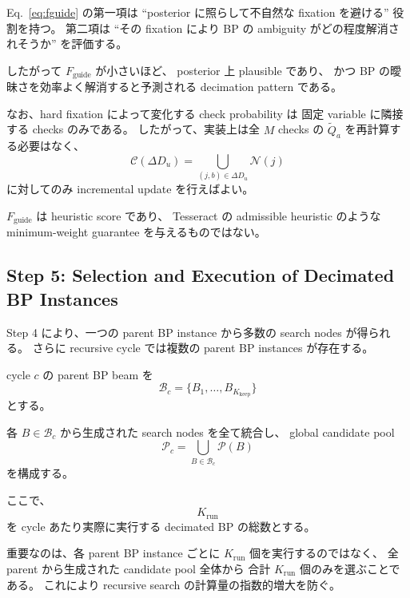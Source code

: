 Eq.~\eqref{eq:fguide} の第一項は
``posterior に照らして不自然な fixation を避ける''
役割を持つ。
第二項は
``その fixation により BP の ambiguity がどの程度解消されそうか''
を評価する。

したがって $F_{\mathrm{guide}}$ が小さいほど、
posterior 上 plausible であり、
かつ BP の曖昧さを効率よく解消すると予測される
decimation pattern である。

なお、hard fixation によって変化する check probability は
固定 variable に隣接する checks のみである。
したがって、実装上は全 $M$ checks の
$\widetilde Q_a$ を再計算する必要はなく、
\begin{equation}
    \mathcal{C}(\Delta D_u)
    =
    \bigcup_{(j,b)\in\Delta D_u}\mathcal{N}(j)
\end{equation}
に対してのみ incremental update を行えばよい。

$F_{\mathrm{guide}}$ は heuristic score であり、
Tesseract の admissible heuristic のような
minimum-weight guarantee を与えるものではない。


\subsection{Step 5: Selection and Execution of Decimated BP Instances}

Step 4 により、一つの parent BP instance から多数の search nodes が得られる。
さらに recursive cycle では複数の parent BP instances が存在する。

cycle $c$ の parent BP beam を
\begin{equation}
    \mathcal{B}_c
    =
    \{B_1,\ldots,B_{K_{\mathrm{keep}}}\}
\end{equation}
とする。

各 $B\in\mathcal{B}_c$ から生成された search nodes を全て統合し、
global candidate pool
\begin{equation}
    \mathcal{P}_c
    =
    \bigcup_{B\in\mathcal{B}_c}
    \mathcal{P}(B)
\end{equation}
を構成する。

ここで、
\begin{equation}
    K_{\mathrm{run}}
\end{equation}
を cycle あたり実際に実行する decimated BP の総数とする。

重要なのは、各 parent BP instance ごとに
$K_{\mathrm{run}}$ 個を実行するのではなく、
全 parent から生成された candidate pool 全体から
合計 $K_{\mathrm{run}}$ 個のみを選ぶことである。
これにより recursive search の計算量の指数的増大を防ぐ。


